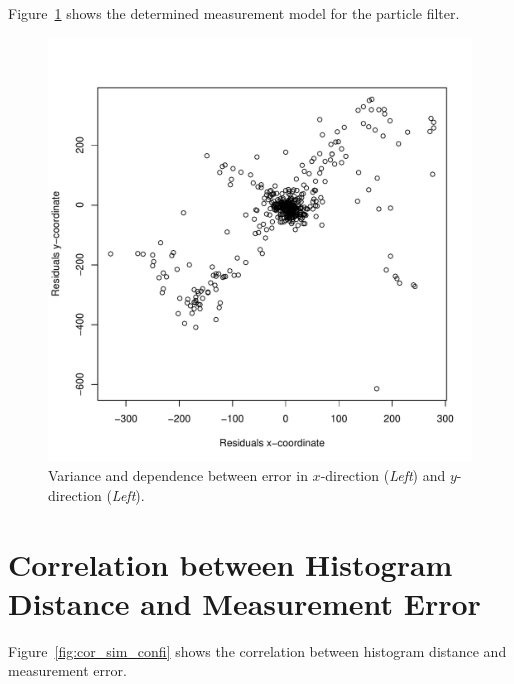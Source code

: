 \documentclass[11pt]{report}
\begin{document}
Figure~\ref{fig:measurementmodel} shows the determined measurement
model for the particle filter.

\begin{figure}[h!]
\label{fig:measurementmodel}
\begin{center}
\includegraphics[width=0.7\columnwidth]{measurement_model}
\caption{{Variance and dependence between error in $x$-direction
    (\emph{Left}) and $y$-direction (\emph{Left}).%
  }}
\end{center}
\end{figure}


\section{Correlation between Histogram Distance and Measurement Error}

Figure~\ref{fig:cor_sim_confi} shows the correlation between histogram
distance and measurement error.
\end{document}
